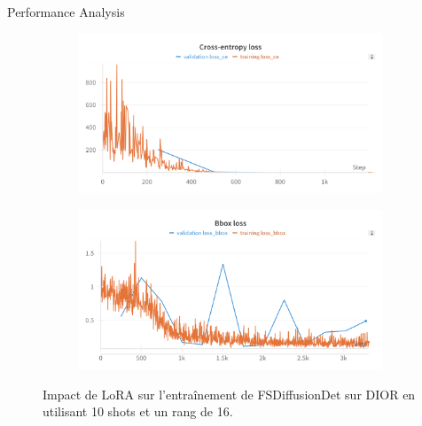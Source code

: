 \begin{subsectionframemod}{Performance Analysis}

\begin{figure}[h]
        \centering
        \begin{subfigure}{0.5\textwidth}
            \includegraphics[width=\textwidth]{Figures/lora4.png}
        \end{subfigure}
        \begin{subfigure}{0.5\textwidth}
            \includegraphics[width=\textwidth]{Figures/lora5.png}
        \end{subfigure}
        \caption{Impact de LoRA sur l'entraînement de FSDiffusionDet sur DIOR en utilisant 10 shots et un rang de 16.}
        \label{fig:lora_curves}
    \end{figure}
\end{subsectionframemod}

